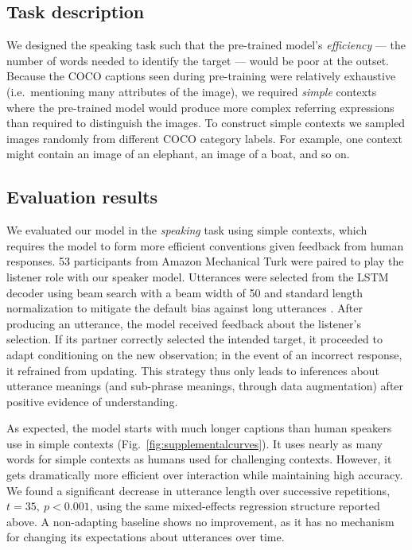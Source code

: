 \documentclass[11pt,a4paper]{article}
\begin{document}
\subsection*{Task description}

We designed the speaking task such that the pre-trained model's \emph{efficiency} --- the number of words needed to identify the target --- would be poor at the outset. 
Because the COCO captions seen during pre-training were relatively exhaustive (i.e.~mentioning many attributes of the image), we required \emph{simple} contexts where the pre-trained model would produce more complex referring expressions than required to distinguish the images. 
To construct simple contexts we sampled images randomly from different COCO category labels.
For example, one context might contain an image of an elephant, an image of a boat, and so on.

\subsection*{Evaluation results}
\label{sec:speaking_task}

We evaluated our model in the \emph{speaking} task using simple contexts, which requires the model to form more efficient conventions given feedback from human responses.
53 participants from Amazon Mechanical Turk were paired to play the listener role with our speaker model.
Utterances were selected from the LSTM decoder using beam search with a beam width of 50 and standard length normalization to mitigate the default bias against long utterances \cite[e.g.][]{wu2016google}.
After producing an utterance, the model received feedback about the listener's selection. 
If its partner correctly selected the intended target, it proceeded to adapt conditioning on the new observation; in the event of an incorrect response, it refrained from updating.
This strategy thus only leads to inferences about utterance meanings (and sub-phrase meanings, through data augmentation) after positive evidence of understanding.

As expected, the model starts with much longer captions than human speakers use in simple contexts (Fig.\ \ref{fig:supplementalcurves}).
It uses nearly as many words for simple contexts as humans used for challenging contexts. 
However, it gets dramatically more efficient over interaction while maintaining high accuracy. 
We found a significant decrease in utterance length over successive repetitions, $t=35,~p <0.001$, using the same mixed-effects regression structure reported above.
A non-adapting baseline shows no improvement, as it has no mechanism for changing its expectations about utterances over time.
\end{document}
